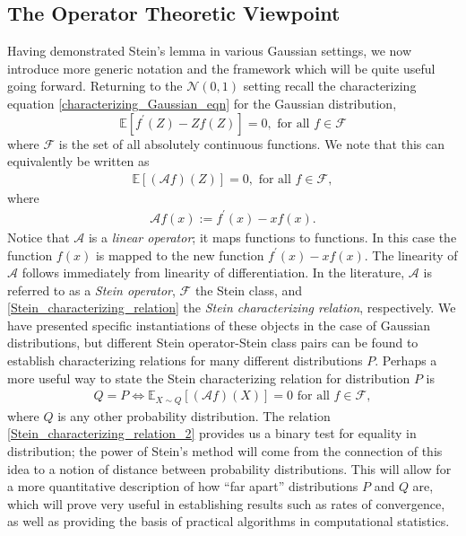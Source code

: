 \documentclass[12pt]{article}
\newcommand{\E}{\mathbb{E}}
\newcommand{\Gaussian}{\mathcal{N}}
\newcommand{\functionSpace}{\mathcal{F}}
\newcommand{\steinOperator}{\mathcal{A}}
\newcommand{\dist}{P}
\newcommand{\distApprox}{Q}
\begin{document}
\subsection{The Operator Theoretic Viewpoint}
Having demonstrated Stein's lemma in various Gaussian settings, we now introduce more generic notation and the framework which will be quite useful going forward. Returning to 
the $\Gaussian(0, 1)$ setting recall the characterizing equation \ref{characterizing_Gaussian_eqn} for the Gaussian distribution, 
\[
\E\left[f^\prime(Z) - Z f(Z) \right] = 0, \text{ for all } f \in \functionSpace
\]
where $\functionSpace$ is the set of all absolutely continuous functions. We note that this can equivalently be written as 
\begin{align}
\E\left[(\steinOperator f)(Z) \right] = 0, \text{ for all } f \in \functionSpace, \label{Stein_characterizing_relation}
\end{align}
where 
\begin{align}
\steinOperator f(x) := f^\prime(x) - xf(x).
\end{align}
Notice that $\steinOperator$ is a \textit{linear operator}; it maps functions to functions. In this case the function $f(x)$ is mapped to the new function 
$f^\prime(x) - xf(x)$. The linearity of $\steinOperator$ follows immediately from linearity of differentiation. In the literature, $\steinOperator$ is referred to as 
a \textit{Stein operator}, $\functionSpace$ the Stein class, and \ref{Stein_characterizing_relation} the \textit{Stein characterizing relation}, respectively. We have 
presented specific instantiations of these objects in the case of Gaussian distributions, but different Stein operator-Stein class pairs can be found to establish 
characterizing relations for many different distributions $\dist$. Perhaps a more useful way to state the Stein characterizing relation for distribution $\dist$
 is
 \begin{align}
 \distApprox = \dist \iff \E_{X \sim \distApprox} \left[(\steinOperator f)(X) \right] = 0 \text{ for all } f \in \functionSpace, \label{Stein_characterizing_relation_2}
 \end{align}
 where $\distApprox$ is any other probability distribution. The relation \ref{Stein_characterizing_relation_2} provides us a binary test for equality in distribution; 
 the power of Stein's method will come from the connection of this idea to a notion of distance between probability distributions. This will allow for a more 
 quantitative description of how ``far apart'' distributions $\dist$ and $\distApprox$ are, which will prove very useful in establishing results such as rates of convergence, 
 as well as providing the basis of practical algorithms in computational statistics. 
\end{document}
